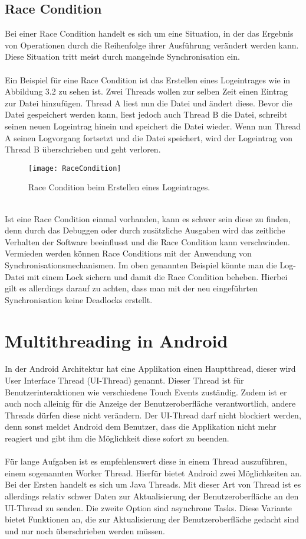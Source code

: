 \subsection{Race Condition}
Bei einer Race Condition handelt es sich um eine Situation, in der das Ergebnis von Operationen durch die Reihenfolge ihrer Ausführung verändert werden kann. Diese Situation tritt meist durch mangelnde Synchronisation ein.\cite{34}
\\
\\
Ein Beispiel für eine Race Condition ist das Erstellen eines Logeintrages wie in Abbildung 3.2 zu sehen ist. Zwei Threads wollen zur selben Zeit einen Eintrag zur Datei hinzufügen. Thread A liest nun die Datei und ändert diese. Bevor die Datei gespeichert werden kann, liest jedoch auch Thread B die Datei, schreibt seinen neuen Logeintrag hinein und speichert die Datei wieder. Wenn nun Thread A seinen Logvorgang fortsetzt und die Datei speichert, wird der Logeintrag von Thread B überschrieben und geht verloren.
\\
\begin{figure}
\centering
\texttt{[image: RaceCondition]}
\caption{Race Condition beim Erstellen eines Logeintrages.}
\label{fig:RaceCondition}
\end{figure}
\\
Ist eine Race Condition einmal vorhanden, kann es schwer sein diese zu finden, denn durch das Debuggen oder durch zusätzliche Ausgaben wird das zeitliche Verhalten der Software beeinflusst und die Race Condition kann verschwinden. Vermieden werden können Race Conditions mit der Anwendung von Synchronisationsmechanismen. Im oben genannten Beispiel könnte man die Log-Datei mit einem Lock sichern und damit die Race Condition beheben. Hierbei gilt es allerdings darauf zu achten, dass man mit der neu eingeführten Synchronisation keine Deadlocks erstellt.


\section{Multithreading in Android}
In der Android Architektur hat eine Applikation einen Hauptthread, dieser wird User Interface Thread (UI-Thread) genannt. Dieser Thread ist für Benutzerinteraktionen wie verschiedene Touch Events zuständig. Zudem ist er auch noch alleinig für die Anzeige der Benutzeroberfläche verantwortlich, andere Threads dürfen diese nicht verändern. Der UI-Thread darf nicht blockiert werden, denn sonst meldet Android dem Benutzer, dass die Applikation nicht mehr reagiert und gibt ihm die Möglichkeit diese sofort zu beenden.\cite{35}
\\
\\
Für lange Aufgaben ist es empfehlenswert diese in einem Thread auszuführen, einem sogenannten Worker Thread. Hierfür bietet Android zwei Möglichkeiten an. Bei der Ersten handelt es sich um Java Threads. Mit dieser Art von Thread ist es allerdings relativ schwer Daten zur Aktualisierung der Benutzeroberfläche an den UI-Thread zu senden. Die zweite Option sind asynchrone Tasks. Diese Variante bietet Funktionen an, die zur Aktualisierung der Benutzeroberfläche gedacht sind und nur noch überschrieben werden müssen.\cite{35}

